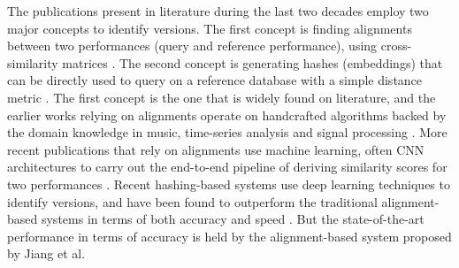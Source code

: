 \documentclass[../main.tex]{subfiles}
\begin{document}
\begin{table}[h]
    \centering
    \caption{Musical changes that can be observed in different version categories}
    \label{tab:musical_changes_cover_songs}
\end{table}

\par
The publications present in literature during the last two decades employ two major concepts to identify versions. The first concept is finding alignments between two performances (query and reference performance), using cross-similarity matrices \cite{gomezSongRemainsSame2006,footeARTHURRetrievingOrchestral2000,serraChromaBinarySimilarity2008,serraCrossRecurrenceQuantification2009,jiang_yang_chen_2020}. The second concept is generating hashes (embeddings) that can be directly used to query on a reference database with a simple distance metric \cite{dorasCoverDetectionUsing2019,yeSupervisedDeepHashing2019b,yuTemporalPyramidPooling2019,yesilerAccurateScalableVersion2020,yesilerLessMoreFaster2020}. The first concept is the one that is widely found on literature, and the earlier works relying on alignments operate on handcrafted algorithms backed by the domain knowledge in music, time-series analysis and signal processing \cite{gomezSongRemainsSame2006,footeARTHURRetrievingOrchestral2000,serraChromaBinarySimilarity2008,serraCrossRecurrenceQuantification2009}. More recent publications that rely on alignments use machine learning, often \gls{CNN} architectures to carry out the end-to-end pipeline of deriving similarity scores for two performances \cite{jiang_yang_chen_2020}. Recent hashing-based systems use deep learning techniques to identify versions, and have been found to outperform the traditional alignment-based systems in terms of both accuracy and speed \cite{dorasCoverDetectionUsing2019,yeSupervisedDeepHashing2019b,yuTemporalPyramidPooling2019,yesilerAccurateScalableVersion2020,yesilerLessMoreFaster2020}. But the state-of-the-art performance in terms of accuracy is held by the alignment-based system proposed by Jiang et al. \cite{jiang_yang_chen_2020}
\end{document}
